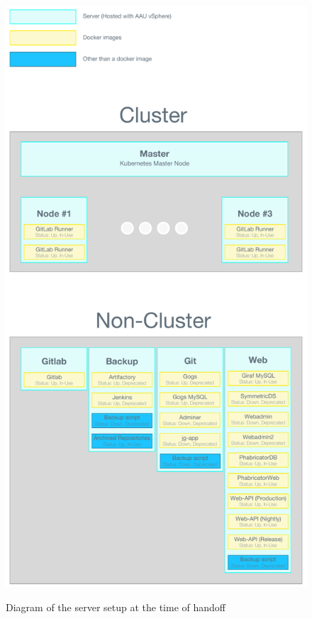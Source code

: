 \begin{figure}[h]
    \centering
    \caption{Diagram of the server setup at the time of handoff\cite[p.~74]{SW611F18}}
    \includegraphics[height=1\textheight]{figures/Server-Overview.pdf}
    \label{fig:state-at-handoff:server}
\end{figure}
